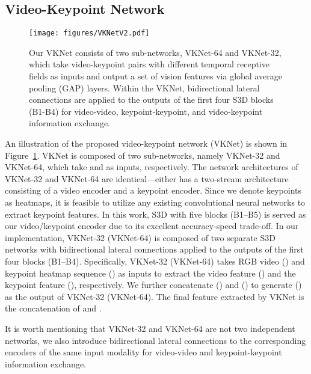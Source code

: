 \documentclass[10pt,twocolumn,letterpaper]{article}
\begin{document}
\subsection{Video-Keypoint Network}
\label{sec:vknet}
\begin{figure}[t]
\centering
\texttt{[image: figures/VKNetV2.pdf]}
\vspace{-7mm}
\caption{Our VKNet consists of two sub-networks, VKNet-64 and VKNet-32, which take video-keypoint pairs with different temporal receptive fields as inputs and output a set of vision features via global average pooling (GAP) layers. Within the VKNet, bidirectional lateral connections \cite{duan2022revisiting} are applied to the outputs of the first four S3D blocks (B1-B4) for video-video, keypoint-keypoint, and video-keypoint information exchange.}
\vspace{-5mm}
\label{fig:vknet}
\end{figure}

An illustration of the proposed video-keypoint network (VKNet) is shown in Figure~\ref{fig:vknet}. VKNet is composed of two sub-networks, namely VKNet-32 and VKNet-64, which take  and  as inputs, respectively. The network architectures of VKNet-32 and VKNet-64 are identical—either has a two-stream architecture consisting of a video encoder and a keypoint encoder. Since we denote keypoints as heatmaps, it is feasible to utilize any existing convolutional neural networks to extract keypoint features. In this work, S3D \cite{xie2018rethinking} with five blocks (B1--B5) is served as our video/keypoint encoder due to its excellent accuracy-speed trade-off. In our implementation, VKNet-32 (VKNet-64) is composed of two separate S3D networks with bidirectional lateral connections \cite{duan2022revisiting} applied to the outputs of the first four blocks (B1--B4). Specifically, VKNet-32 (VKNet-64) takes RGB video  () and keypoint heatmap sequence  () as inputs to extract the video feature  () and the keypoint feature  (), respectively. 
We further concatenate  () and  () to generate  () as the output of VKNet-32 (VKNet-64). The final feature  extracted by VKNet is the concatenation of  and .



It is worth mentioning that VKNet-32 and VKNet-64 are not two independent networks, we also introduce bidirectional lateral connections \cite{duan2022revisiting} to the corresponding encoders of the same input modality for video-video and keypoint-keypoint information exchange.
\end{document}
